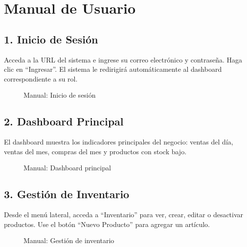 \documentclass[12pt, letterpaper]{report}
\begin{document}
\chapter{Manual de Usuario}

\section*{1. Inicio de Sesión}
Acceda a la URL del sistema e ingrese su correo electrónico y contraseña. Haga clic en ``Ingresar''. El sistema le redirigirá automáticamente al dashboard correspondiente a su rol.

\begin{figure}[H]
\centering
{}
\caption{Manual: Inicio de sesión}
\end{figure}

\section*{2. Dashboard Principal}
El dashboard muestra los indicadores principales del negocio: ventas del día, ventas del mes, compras del mes y productos con stock bajo.

\begin{figure}[H]
\centering
{}
\caption{Manual: Dashboard principal}
\end{figure}

\section*{3. Gestión de Inventario}
Desde el menú lateral, acceda a ``Inventario'' para ver, crear, editar o desactivar productos. Use el botón ``Nuevo Producto'' para agregar un artículo.

\begin{figure}[H]
\centering
{}
\caption{Manual: Gestión de inventario}
\end{figure}
\end{document}
